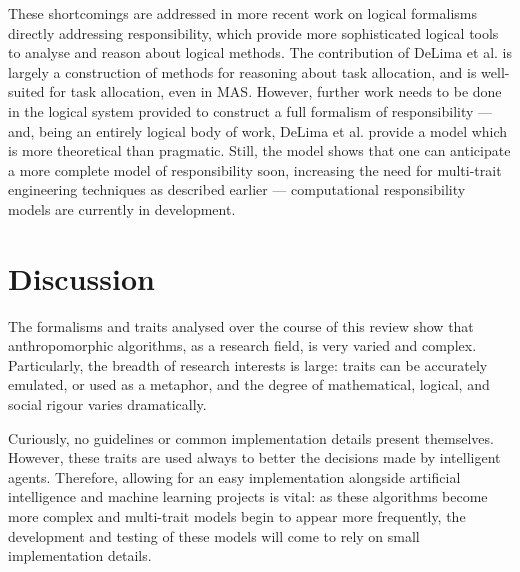 \documentclass[11pt,english,twocolumn]{article}
\begin{document}
These shortcomings are addressed in more recent work on logical formalisms directly addressing responsibility\cite{DeLima2008}, which provide more sophisticated logical tools to analyse and reason about logical methods. The contribution of DeLima et al. is largely a construction of methods for reasoning about task allocation, and is well-suited for task allocation, even in MAS. However, further work needs to be done in the logical system provided to construct a full formalism of responsibility --- and, being an entirely logical body of work, DeLima et al. provide a model which is more theoretical than pragmatic. Still, the model shows that one can anticipate a more complete model of responsibility soon, increasing the need for multi-trait engineering techniques as described earlier --- computational responsibility models are currently in development\cite{wallis2017}.\par 


\section{Discussion}
The formalisms and traits analysed over the course of this review show that anthropomorphic algorithms, as a research field, is very varied and complex. Particularly, the breadth of research interests is large: traits can be accurately emulated, or used as a metaphor, and the degree of mathematical, logical, and social rigour varies dramatically.\par

Curiously, no guidelines or common implementation details present themselves. However, these traits are used always to better the decisions made by intelligent agents. Therefore, allowing for an easy implementation alongside artificial intelligence and machine learning projects is vital: as these algorithms become more complex and multi-trait models begin to appear more frequently, the development and testing of these models will come to rely on small implementation details.\par
\end{document}
